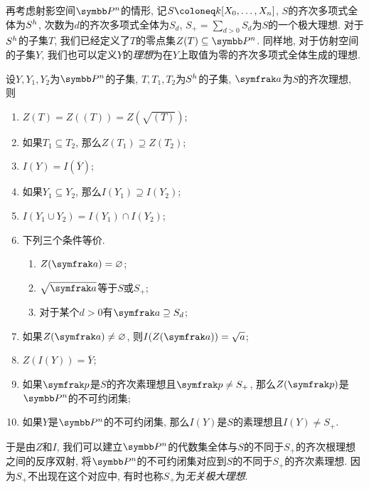 再考虑射影空间$\PP^n$的情形, 记$S\coloneq \kk [X_0, \dotsc, X_n]$, $S$的齐次多项式全体为$S^h$, 次数为$d$的齐次多项式全体为$S_d$, $S_+=\sum_{d>0}S_d$为$S$的一个极大理想. 对于$S^h$的子集$T$, 我们已经定义了$T$的零点集$Z(T)\subseteq\PP^n$. 同样地, 对于仿射空间的子集$Y$, 我们也可以定义$Y$的\emph{理想}为在$Y$上取值为零的齐次多项式全体生成的理想.

\begin{proposition}\label{prop:projectivegaloisconnectionclosedradical}
    设$Y, Y_1, Y_2$为$\PP^n$的子集, $T, T_1, T_2$为$S^h$的子集, $\ideal{a}$为$S$的齐次理想, 则
    \begin{enumerate}
        \item\label{enum:prop-projective-galois-connection-closed-radical-1} $Z(T)=Z((T))=Z(\sqrt{(T)})$;
        \item\label{enum:prop-projective-galois-connection-closed-radical-2} 如果$T_1\subseteq T_2$, 那么$Z(T_1)\supseteq Z(T_2)$;
        \item\label{enum:prop-projective-galois-connection-closed-radical-3} $I(Y)=I(\overline{Y})$;
        \item\label{enum:prop-projective-galois-connection-closed-radical-4} 如果$Y_1\subseteq Y_2$, 那么$I(Y_1)\supseteq I(Y_2)$;
        \item\label{enum:prop-projective-galois-connection-closed-radical-5} $I(Y_1\cup Y_2)=I(Y_1)\cap I(Y_2)$;
        \item 下列三个条件等价.
        \begin{enumerate}
            \item $Z(\ideal{a})=\varnothing$;
            \item $\sqrt{\ideal{a}}$等于$S$或$S_+$;
            \item 对于某个$d>0$有$\ideal{a}\supseteq S_d$;
        \end{enumerate}
        \item\label{enum:prop-projective-galois-connection-closed-radical-nullstellensatz} 如果$Z(\ideal{a})\neq\varnothing$, 则$I(Z(\ideal{a}))=\sqrt{a}$;
        \item\label{enum:prop-projective-galois-connection-closed-radical-closure} $Z(I(Y))=\overline{Y}$;
        \item\label{enum:prop-projective-galois-connection-closed-radical-8} 如果$\ideal{p}$是$S$的齐次素理想且$\ideal{p}\neq S_+$, 那么$Z(\ideal{p})$是$\PP^n$的不可约闭集;
        \item\label{enum:prop-projective-galois-connection-closed-radical-9} 如果$Y$是$\PP^n$的不可约闭集, 那么$I(Y)$是$S$的素理想且$I(Y)\neq S_+$.
    \end{enumerate}
    于是由$Z$和$I$, 我们可以建立$\PP^n$的代数集全体与$S$的不同于$S_+$的齐次根理想之间的反序双射, 将$\PP^n$的不可约闭集对应到$S$的不同于$S_+$的齐次素理想. 因为$S_+$不出现在这个对应中, 有时也称$S_+$为\emph{无关极大理想}.
\end{proposition}

